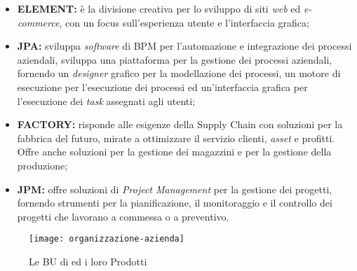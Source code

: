 \begin{itemize}
\item \textbf{ELEMENT:} è la divisione creativa per lo sviluppo di siti \textit{web} ed \textit{e-commerce}, con un focus sull'esperienza utente e l'interfaccia grafica;
\item \textbf{JPA:} sviluppa \textit{software} di \gls{BPM} per l'automazione e integrazione dei processi aziendali, sviluppa una piattaforma per la gestione dei processi aziendali, fornendo un \textit{designer}  grafico per la modellazione dei processi, un motore di esecuzione per l'esecuzione dei processi ed un'interfaccia grafica per l'esecuzione dei \textit{task} assegnati agli utenti;
\item \textbf{FACTORY:} risponde alle esigenze della \gls{Supply Chain} con soluzioni per la fabbrica del futuro, mirate a ottimizzare il servizio clienti, \textit{asset} e profitti. Offre anche soluzioni per la gestione dei magazzini e per la gestione della produzione; 
\item \textbf{JPM:} offre soluzioni di \textit{\gls{Project Management}} per la gestione dei progetti, fornendo strumenti per la pianificazione, il monitoraggio e il controllo dei progetti che lavorano a commessa o a preventivo.
\end{itemize}

\begin{figure}[!h] 
  \centering 
  \texttt{[image: organizzazione-azienda]} 
  \caption{Le BU di {\azienda} ed i loro Prodotti\protect\footnotemark}
  \label{fig:organizzazione-azienda}
\end{figure}
\newpage

